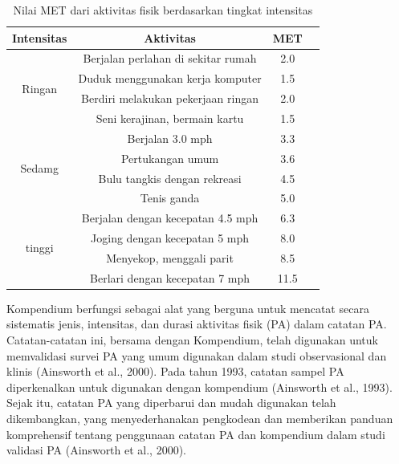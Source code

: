 \begin{longtable}{|c|c|c|c|}
  \caption{Nilai MET dari aktivitas fisik berdasarkan tingkat intensitas}
  \label{tb:metintensitas}  \\
  \hline
  \rowcolor[HTML]{C0C0C0}
  \textbf{Intensitas} & \textbf{Aktivitas} & \textbf{MET} \\
  \hline
  \multirow{4}{*}{Ringan}     & Berjalan perlahan di sekitar rumah      & 2.0     \\
  \cline{2-3} &
                                Duduk menggunakan kerja komputer        & 1.5     \\
  \cline{2-3} &
                                Berdiri melakukan pekerjaan ringan      & 2.0     \\
  \cline{2-3} &
                                Seni kerajinan, bermain kartu           & 1.5    \\
  \hline
  \multirow{4}{*}{Sedamg}     & Berjalan 3.0 mph                        & 3.3     \\
  \cline{2-3} &
                                Pertukangan umum                        & 3.6    \\
  \cline{2-3} &
                                Bulu tangkis dengan rekreasi            & 4.5    \\
  \cline{2-3} &
                                Tenis ganda                             & 5.0    \\
  \hline
  \multirow{4}{*}{tinggi}     & Berjalan dengan kecepatan 4.5 mph       & 6.3    \\
  \cline{2-3} &
                                Joging dengan kecepatan 5 mph           & 8.0    \\
  \cline{2-3} &
                                Menyekop, menggali parit                & 8.5    \\
  \cline{2-3} &
                                Berlari dengan kecepatan 7 mph          & 11.5    \\
  \hline
\end{longtable}

Kompendium berfungsi sebagai alat yang berguna untuk mencatat secara sistematis jenis, intensitas, dan durasi aktivitas fisik (PA) dalam catatan PA. Catatan-catatan ini, bersama dengan Kompendium, telah digunakan untuk memvalidasi survei PA yang umum digunakan dalam studi observasional dan klinis (Ainsworth et al., 2000). Pada tahun 1993, catatan sampel PA diperkenalkan untuk digunakan dengan kompendium (Ainsworth et al., 1993). Sejak itu, catatan PA yang diperbarui dan mudah digunakan telah dikembangkan, yang menyederhanakan pengkodean dan memberikan panduan komprehensif tentang penggunaan catatan PA dan kompendium dalam studi validasi PA (Ainsworth et al., 2000).


